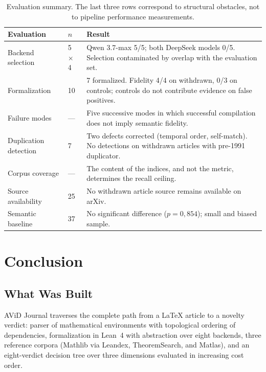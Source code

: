 \documentclass[12pt,a4paper]{article}
\theoremstyle{remark}
\begin{document}
\begin{table}[htbp]
\centering
\small
\setlength{\tabcolsep}{4pt}
\renewcommand{\arraystretch}{1.15}
\begin{tabular}{p{3.6cm}p{1.6cm}p{8.6cm}}
\toprule
Evaluation & $n$ & Result \\
\midrule
Backend selection & 5 $\times$ 4 & Qwen 3.7-max 5/5; both DeepSeek models 0/5. Selection contaminated by overlap with the evaluation set. \\
\addlinespace
Formalization & 10 & 7 formalized. Fidelity 4/4 on withdrawn, 0/3 on controls; controls do not contribute evidence on false positives. \\
\addlinespace
Failure modes & --- & Five successive modes in which successful compilation does not imply semantic fidelity. \\
\addlinespace
Duplication detection & 7 & Two defects corrected (temporal order, self-match). No detections on withdrawn articles with pre-1991 duplicator. \\
\addlinespace
Corpus coverage & --- & The content of the indices, and not the metric, determines the recall ceiling. \\
\addlinespace
Source availability & 25 & No withdrawn article source remains available on arXiv. \\
\addlinespace
Semantic baseline & 37 & No significant difference ($p = 0{,}854$); small and biased sample. \\
\bottomrule
\end{tabular}
\caption{Evaluation summary. The last three rows correspond to structural obstacles, not to pipeline performance measurements.}
\label{tab:resumen}
\end{table}


\section{Conclusion}

\label{sec:conclusion}

\subsection{What Was Built}

AViD Journal traverses the complete path from a LaTeX article to a novelty verdict: parser of mathematical environments with topological ordering of dependencies, formalization in Lean~4 with abstraction over eight backends, three reference corpora (Mathlib via Leandex, TheoremSearch, and Matlas), and an eight-verdict decision tree over three dimensions evaluated in increasing cost order.
\end{document}
